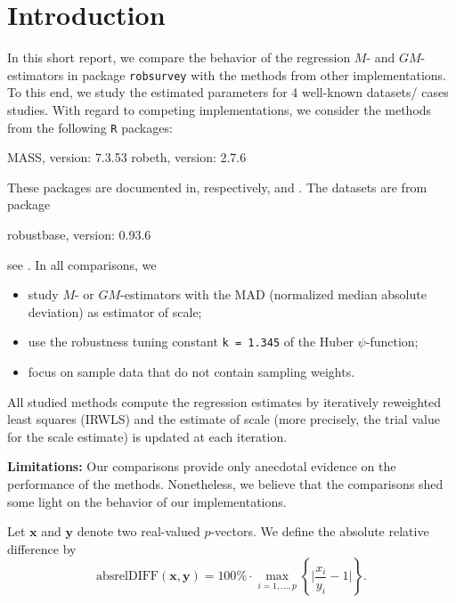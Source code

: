 \documentclass[a4paper,oneside,11pt,DIV=12]{scrartcl}
\newcommand{\code}[1]{{\texttt{#1}}}
\begin{document}
\section{Introduction}\label{sec:intro}
In this short report, we compare the behavior of the regression $M$- and
$GM$-estimators in package \code{robsurvey} with the methods from
other implementations. To this end, we study the estimated parameters
for 4 well-known datasets/ cases studies. With regard to competing
implementations, we consider the methods from the following \code{R}
packages:
\begin{Schunk}
\begin{Soutput}
MASS, version: 7.3.53
robeth, version: 2.7.6
\end{Soutput}
\end{Schunk}
\noindent These packages are documented in, respectively, \cite{mass}
and \cite{robeth}. The datasets are from package
\begin{Schunk}
\begin{Soutput}
robustbase, version: 0.93.6
\end{Soutput}
\end{Schunk}
\noindent see \cite{robustbase}. In all comparisons, we
\begin{itemize}
    \item study $M$- or $GM$-estimators with the MAD (normalized median
        absolute deviation) as estimator of scale;
    \item use the robustness tuning constant \code{k = 1.345} of the
        Huber $\psi$-function;
    \item focus on sample data that do not contain sampling weights.
\end{itemize}
\noindent All studied methods compute the regression estimates by
iteratively reweighted least squares (IRWLS) and the estimate of scale
(more precisely, the trial value for the scale estimate) is updated at
each iteration.

\begin{leftbar}
\textbf{Limitations:} Our comparisons provide only anecdotal evidence
on the performance of the methods. Nonetheless, we believe that the
comparisons shed some light on the behavior of our implementations.
\end{leftbar}

Let $\bm x$ and $\bm y$ denote two real-valued $p$-vectors. We define
the absolute relative difference by
\begin{equation*}
    \mathrm{absrelDIFF}(\bm x, \bm y) = 100\% \cdot \max_{i=1, \ldots, p}
    \left\{ \Big\vert \frac{x_i}{y_i} - 1 \Big\vert \right\}.
\end{equation*}
\end{document}
